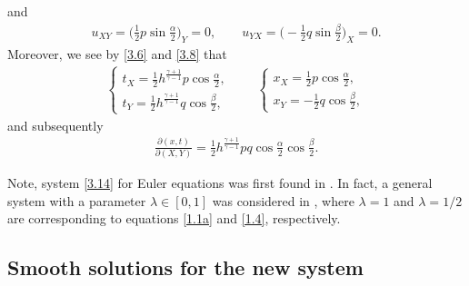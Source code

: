 \documentclass[11pt,reqno]{article}
\newcommand{\dps}{\displaystyle}
\newcommand{\fr}{\frac}
\newcommand{\pa}{\partial}
\numberwithin{equation}{section}
\begin{document}
and
\begin{align}\label{3.15a}
u_{XY}=\Big(\fr{1}{2}p\sin\frac{\alpha}{2}\Big)_Y=0,\qquad u_{YX}=\Big(-\fr{1}{2}q\sin\frac{\beta}{2}\Big)_X=0.
\end{align}
Moreover, we see by \eqref{3.6} and \eqref{3.8} that
\begin{align}\label{3.16}
\left\{
\begin{array}{l}
\dps t_X=\fr{1}{2}h^{\fr{\gamma+1}{\gamma-1}}p\cos\fr{\alpha}{2}, \\[8pt]
\dps t_Y=\fr{1}{2}h^{\fr{\gamma+1}{\gamma-1}}q\cos\fr{\beta}{2},
\end{array}
\right.
\qquad
\left\{
\begin{array}{l}
\dps x_X=\fr{1}{2}p\cos\fr{\alpha}{2}, \\[8pt]
\dps x_Y=-\fr{1}{2}q\cos\fr{\beta}{2},
\end{array}
\right.
\end{align}
and subsequently
\begin{align}\label{3.17}
\fr{\pa(x,t)}{\pa(X,Y)}=\fr{1}{2}h^{\fr{\gamma+1}{\gamma-1}}pq\cos\fr{\alpha}{2}\cos\fr{\beta}{2}.
\end{align}

Note, system \eqref{3.14} for Euler equations was first found in \cite{CS}. In fact, a general system with a parameter $\lambda\in[0,1]$ was considered in \cite{CS}, where $\lambda=1$ and $\lambda=1/2$ are corresponding to equations \ref{1.1a} and \ref{1.4}, respectively.

\subsection{Smooth solutions for the new system}\label{S32}
\end{document}
